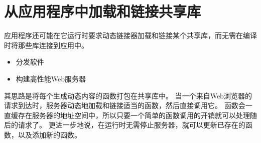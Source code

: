 
\section{从应用程序中加载和链接共享库}
{
    应用程序还可能在它运行时要求动态链接器加载和链接某个共享库，而无需在编译时将那些库连接到应用中。

    \begin{itemize}
        \item 分发软件
        \item 构建高性能Web服务器
    \end{itemize}

    其思路是将每个生成动态内容的函数打包在共享库中。
    当一个来自Web浏览器的请求到达时，服务器动态地加载和链接适当的函数，然后直接调用它。
    函数会一直缓存在服务器的地址空间中，所以只要一个简单的函数调用的开销就可以处理随后的请求了。
    更进一步地说，在运行时无需停止服务器，就可以更新已存在的函数，以及添加新的函数。
}

